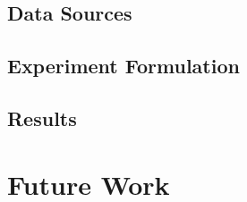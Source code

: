 \documentclass{article}
\begin{document}
\subsection{Data Sources}



\subsection{Experiment Formulation}



\subsection{Results}



\section{Future Work}






\end{document}
